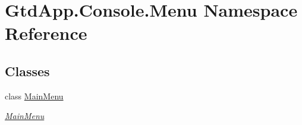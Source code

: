 \hypertarget{namespace_gtd_app_1_1_console_1_1_menu}{}\section{Gtd\+App.\+Console.\+Menu Namespace Reference}
\label{namespace_gtd_app_1_1_console_1_1_menu}
\subsection*{Classes}
\begin{DoxyCompactItemize}
\item 
class \mbox{\hyperlink{class_gtd_app_1_1_console_1_1_menu_1_1_main_menu}{Main\+Menu}}
\begin{DoxyCompactList}\small\item\em \mbox{\hyperlink{class_gtd_app_1_1_console_1_1_menu_1_1_main_menu}{Main\+Menu}} \end{DoxyCompactList}\end{DoxyCompactItemize}
